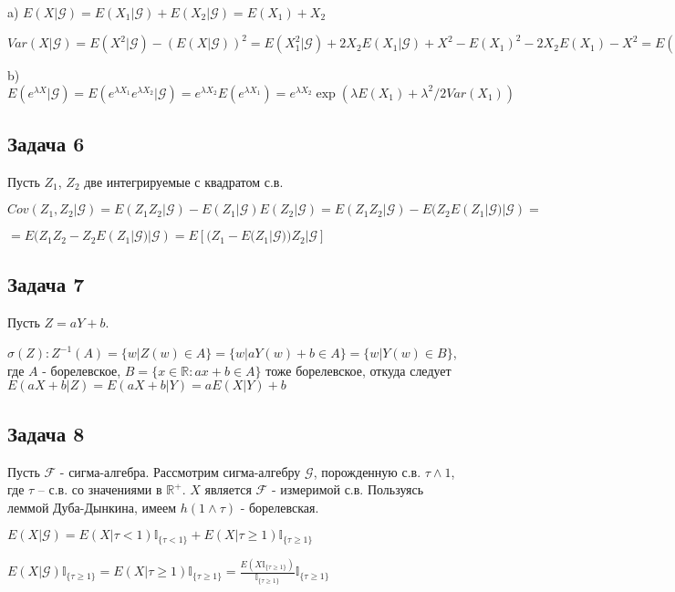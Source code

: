 \documentclass[a4paper,12pt]{article} %
\begin{document}
a) $E(X|\mathcal{G}) = E(X_1|\mathcal{G}) + E(X_2|\mathcal{G}) = E(X_1) + X_2 $

$Var(X|\mathcal{G}) =  E(X^2|\mathcal{G}) - (E(X|\mathcal{G}))^2 = E(X_1^2|\mathcal{G}) + 2X_2  E(X_1|\mathcal{G}) + X^2 - E(X_1)^2 - 2X_2E(X_1) - X^2  =  E(X_1^2) - - E(X_1)^2 = Var(X_1) $

b) $E(e^{\lambda X}| \mathcal{G} ) = E(e^{\lambda X_1} e^{\lambda X_2}| \mathcal{G} )  =  e^{\lambda X_2} E(e^{\lambda X_1})  =  e^{\lambda X_2}  \exp(\lambda E(X_1) + \lambda^2/2 Var(X_1)) $

\subsection*{Задача 6}
Пусть $Z_1$, $Z_2$  две интегрируемые с квадратом с.в. 


$Cov(Z_1, Z_2 | \mathcal{G} ) = E(Z_1Z_2| \mathcal{G}) − E(Z_1 | \mathcal{G})E(Z_2 | \mathcal{G}) = E(Z_1Z_2| \mathcal{G}) − E(Z_2 E(Z_1 | \mathcal{G}) | \mathcal{G})= $

$= E(Z_1Z_2 − Z_2 E(Z_1 | \mathcal{G}) | \mathcal{G})  =  E[(Z_1-E(Z_1|\mathcal{G}))Z_2|\mathcal{G}]$

\subsection*{Задача 7}
Пусть $Z =a Y  + b$. 


$\sigma(Z):  Z^{-1}(A) = \{w|Z(w) \in A \} = \{w|aY(w)+b \in A \} =  \{w|Y(w) \in B \}   $, где $A$ - борелевское, $B = \{ x \in \mathbb{R} : a x +b \in A\} $
 тоже борелевское, откуда следует  $E(aX + b|Z) = E(aX + b|Y)  =  aE(X|Y) + b$
 


\subsection*{Задача 8}

 Пусть $\mathcal{F}$ - сигма-алгебра. Рассмотрим сигма-алгебру $\mathcal{G}$, порожденную с.в. $\tau \wedge 1$,
где $\tau$ – с.в. со значениями в $\mathbb{R}^+$. $X$ является $\mathcal{F}$ - измеримой с.в. Пользуясь леммой Дуба-Дынкина, имеем $h(1 \wedge \tau)$ - борелевская.

$E(X|\mathcal{G}) = E(X|\tau<1) \mathbb{I}_{\{\tau < 1 \}} + E(X|\tau\geq 1) \mathbb{I}_{\{\tau \geq 1 \}} $

$E(X|\mathcal{G}) \mathbb{I}_{\{\tau \geq 1 \}}  = E(X|\tau\geq 1) \mathbb{I}_{\{\tau \geq 1 \}} =
\frac{E(X \mathbb{I}_{\{\tau \geq 1 \}})}{\mathbb{I}_{\{\tau \geq 1 \}}} \mathbb{I}_{\{\tau \geq 1 \}}$
 
\end{document}
